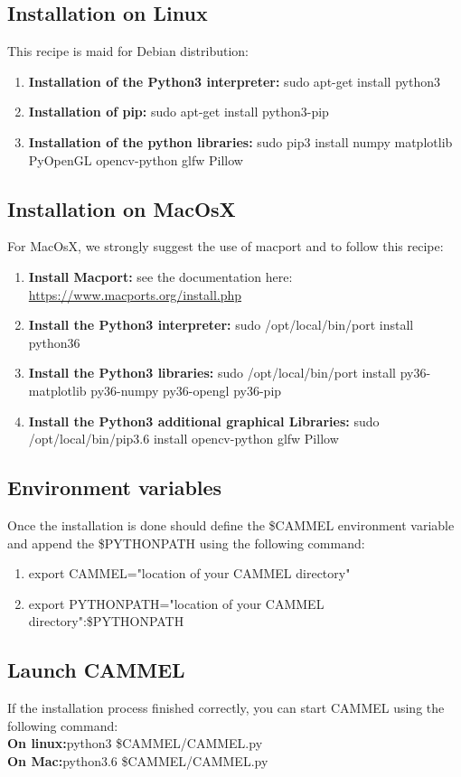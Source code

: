 \documentclass[12pt,a4paper]{article}
\begin{document}
\subsection{Installation on Linux}
This recipe is maid for Debian distribution:
\begin{enumerate}
\item{\textbf{Installation of the Python3 interpreter:} sudo apt-get install python3}
\item{\textbf{Installation of pip:} sudo apt-get install python3-pip}
\item{\textbf{Installation of the python libraries:} sudo pip3 install numpy matplotlib PyOpenGL opencv-python glfw Pillow}
\end{enumerate}

\subsection{Installation on MacOsX}
For MacOsX, we strongly suggest the use of macport and to follow this recipe:
\begin{enumerate}
\item{\textbf{Install Macport:} see the documentation here: \href{https://www.macports.org/install.php}{https://www.macports.org/install.php}}
\item{\textbf{Install the Python3 interpreter:} sudo /opt/local/bin/port install python36}
\item{\textbf{Install the Python3 libraries:} sudo /opt/local/bin/port install py36-matplotlib py36-numpy py36-opengl py36-pip}
\item{\textbf{Install the Python3 additional graphical Libraries:} sudo /opt/local/bin/pip3.6 install opencv-python glfw Pillow}
\end{enumerate}

\subsection{Environment variables}
Once the installation is done should define the \$CAMMEL environment variable and append the \$PYTHONPATH using the following command:
\begin{enumerate}
\item{export CAMMEL="location of your CAMMEL directory"}
\item{export PYTHONPATH="location of your CAMMEL directory":\$PYTHONPATH}
\end{enumerate}

\subsection{Launch CAMMEL}
If the installation process finished correctly, you can start CAMMEL using the following command:\\
\textbf{On linux:}python3 \$CAMMEL/CAMMEL.py \\
\textbf{On Mac:}python3.6 \$CAMMEL/CAMMEL.py
\end{document}
